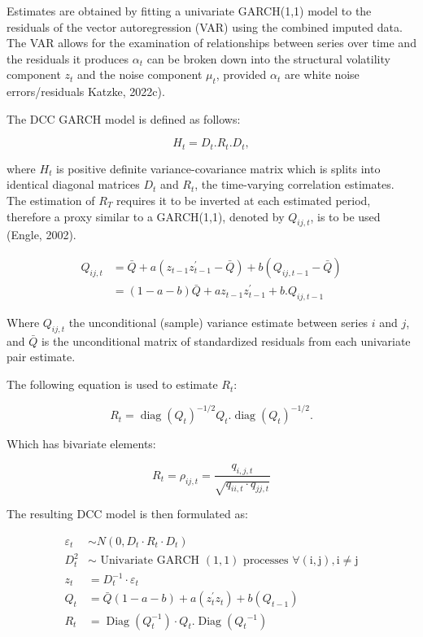 \documentclass[11pt,preprint, authoryear]{elsarticle}
\numberwithin{equation}{section}
\numberwithin{figure}{section}
\numberwithin{table}{section}
\begin{document}
Estimates are obtained by fitting a univariate GARCH(1,1) model to the
residuals of the vector autoregression (VAR) using the combined imputed
data. The VAR allows for the examination of relationships between series
over time and the residuals it produces \(\alpha_{t}\) can be broken
down into the structural volatility component \(z_{t}\) and the noise
component \(\mu_{t}\), provided \(\alpha_{t}\) are white noise
errors/residuals Katzke, 2022c).

The DCC GARCH model is defined as follows:

\[
H_{t}=D_{t}. R_{t}. D_{t},
\]

where \(H_{t}\) is positive definite variance-covariance matrix which is
splits into identical diagonal matrices \(D_{t}\) and \(R_{t}\), the
time-varying correlation estimates. The estimation of \(R_{T}\) requires
it to be inverted at each estimated period, therefore a proxy similar to
a GARCH(1,1), denoted by \(Q_{i j, t}\), is to be used (Engle, 2002).

\[
\begin{aligned}
Q_{i j, t} & =\bar{Q}+a\left(z_{t-1} z_{t-1}^{\prime}-\bar{Q}\right)+b\left(Q_{i j, t-1}-\bar{Q}\right) \\
& =(1-a-b) \bar{Q}+a z_{t-1} z_{t-1}^{\prime}+b . Q_{i j, t-1}
\end{aligned}
\]

Where \(Q_{i j, t}\) the unconditional (sample) variance estimate
between series \(i\) and \(j\), and \(\bar{Q}\) is the unconditional
matrix of standardized residuals from each univariate pair estimate.

The following equation is used to estimate \(R_{t}\):

\[
R_{t}=\operatorname{diag}\left(Q_{t}\right)^{-1 / 2} Q_{t} . \operatorname{diag}\left(Q_{t}\right)^{-1 / 2} .
\]

Which has bivariate elements:

\[
R_{t}=\rho_{i j, t}=\frac{q_{i, j, t}}{\sqrt{q_{i i, t} \cdot q_{j j, t}}}
\]

The resulting DCC model is then formulated as:

\[
\begin{aligned}
\varepsilon_{t} & \sim N\left(0, D_{t} \cdot R_{t} \cdot D_{t}\right) \\
D_{t}^{2} & \sim \text { Univariate GARCH }(1,1) \text { processes } \forall(\mathrm{i}, \mathrm{j}), \mathrm{i} \neq \mathrm{j} \\
z_{t} & =D_{t}^{-1} \cdot \varepsilon_{t} \\
Q_{t} & =\bar{Q}(1-a-b)+a\left(z_{t}^{\prime} z_{t}\right)+b\left(Q_{t-1}\right) \\
R_{t} & =\operatorname{Diag}\left(Q_{t}^{-1}\right) \cdot Q_{t} . \operatorname{Diag}\left(Q_{t}{ }^{-1}\right)
\end{aligned}
\]
\end{document}
